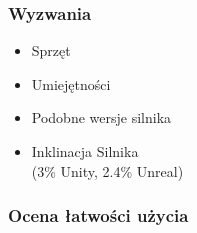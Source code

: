 \documentclass{beamer}
\begin{document}
        {
          \begin{frame}
          \end{frame}
          }
        \begin{frame}
          \frametitle{Wyzwania}
          \begin{itemize}
            \item Sprzęt 
            \item Umiejętności 
            \item Podobne wersje silnika 
            \item Inklinacja Silnika \\ (3\% Unity, 2.4\% Unreal) 
          \end{itemize}  
        \end{frame}  

      \begin{frame} 
        \frametitle{Ocena łatwości użycia}
        \begin{itemize}
          \item Dokumentacja
          \item Intuicyjność
          \item Materiały 
          \item Zasoby (Assety)  
	  \item Dostępne funkcje}
	  \item ChatGPT
        \end{itemize}
      \end{frame}
\end{document}
